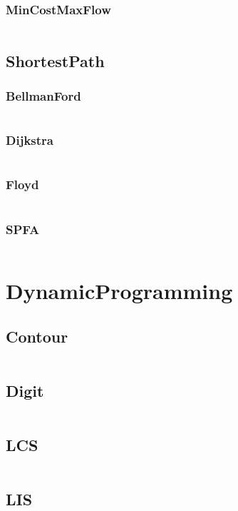 \documentclass[a4paper,11pt]{article}
\begin{document}
\subsubsection{MinCostMaxFlow}
\inputminted[breaklines]{c++}{04++GraphTheory/+NetworkFlow/+MinCostMaxFlow.cpp}

\subsection{ShortestPath}
\subsubsection{BellmanFord}
\inputminted[breaklines]{c++}{04++GraphTheory/+ShortestPath/+BellmanFord.cpp}
\subsubsection{Dijkstra}
\inputminted[breaklines]{c++}{04++GraphTheory/+ShortestPath/+Dijkstra.cpp}
\subsubsection{Floyd}
\inputminted[breaklines]{c++}{04++GraphTheory/+ShortestPath/+Floyd.cpp}
\subsubsection{SPFA}
\inputminted[breaklines]{c++}{04++GraphTheory/+ShortestPath/+SPFA.cpp}


\newpage
\section{DynamicProgramming}
\subsection{Contour}
\inputminted[breaklines]{c++}{05++DynamicProgramming/+Contour.cpp}
\subsection{Digit}
\inputminted[breaklines]{c++}{05++DynamicProgramming/+Digit.cpp}
\subsection{LCS}
\inputminted[breaklines]{c++}{05++DynamicProgramming/+LCS.cpp}
\subsection{LIS}
\inputminted[breaklines]{c++}{05++DynamicProgramming/+LIS.cpp}
\end{document}
